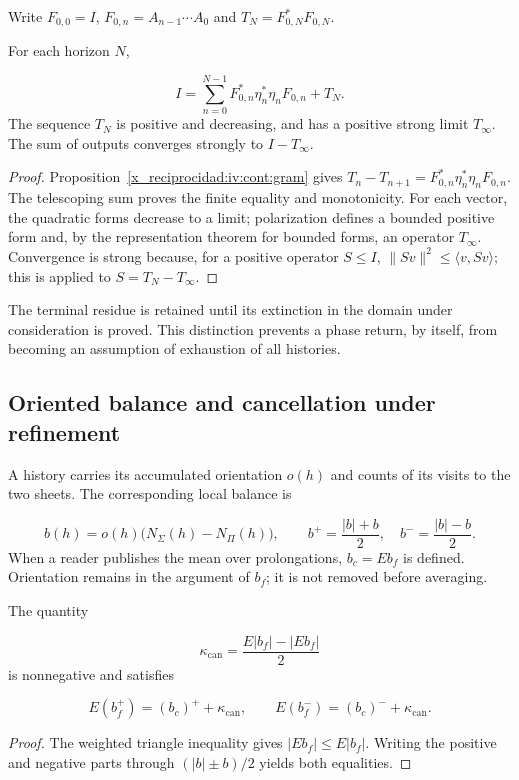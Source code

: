 Write \(F_{0,0}=I\), \(F_{0,n}=A_{n-1}\cdots A_0\) and \(T_N=F_{0,N}^*F_{0,N}\).

\begin{theorem}
\label{x_reciprocidad:iv:cont:terminal}
For each horizon \(N\),

\[
I=\sum_{n=0}^{N-1}
F_{0,n}^*\eta_n^*\eta_nF_{0,n}+T_N.
\]
The sequence \(T_N\) is positive and decreasing, and has a positive strong limit \(T_\infty\). The sum of outputs converges strongly to \(I-T_\infty\).

\end{theorem}
\begin{proof}
Proposition~\ref{x_reciprocidad:iv:cont:gram} gives \(T_n-T_{n+1}=F_{0,n}^*\eta_n^*\eta_nF_{0,n}\). The telescoping sum proves the finite equality and monotonicity. For each vector, the quadratic forms decrease to a limit; polarization defines a bounded positive form and, by the representation theorem for bounded forms, an operator \(T_\infty\). Convergence is strong because, for a positive operator \(S\leq I\), \(\|Sv\|^2\leq\langle v,Sv\rangle\); this is applied to \(S=T_N-T_\infty\).
\end{proof}

The terminal residue is retained until its extinction in the domain under consideration is proved. This distinction prevents a phase return, by itself, from becoming an assumption of exhaustion of all histories.

\subsection{Oriented balance and cancellation under refinement}
\label{x_reciprocidad:iv:cont:balance}
A history carries its accumulated orientation \(o(h)\) and counts of its visits to the two sheets. The corresponding local balance is

\[
b(h)=o(h)\bigl(N_\Sigma(h)-N_\Pi(h)\bigr),
\qquad
b^+=\frac{|b|+b}{2},\quad b^-=\frac{|b|-b}{2}.
\]
When a reader publishes the mean over prolongations, \(b_c=Eb_f\) is defined. Orientation remains in the argument of \(b_f\); it is not removed before averaging.

\begin{proposition}
\label{x_reciprocidad:iv:cont:cancelacion}
The quantity

\[
\kappa_{\mathrm{can}}=
\frac{E|b_f|-|Eb_f|}{2}
\]
is nonnegative and satisfies

\[
E(b_f^+)=(b_c)^++\kappa_{\mathrm{can}},
\qquad
E(b_f^-)=(b_c)^-+\kappa_{\mathrm{can}}.
\]
\end{proposition}
\begin{proof}
The weighted triangle inequality gives \(|Eb_f|\leq E|b_f|\). Writing the positive and negative parts through \((|b|\pm b)/2\) yields both equalities.
\end{proof}

